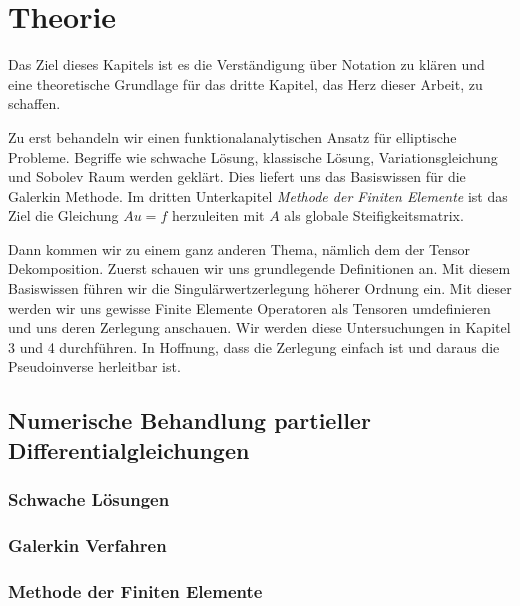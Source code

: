 \documentclass[12pt,a4paper]{scrartcl}
\numberwithin{equation}{section}
\begin{document}


\newpage

\section{Theorie}
Das Ziel dieses Kapitels ist es die Verständigung über Notation zu klären und eine theoretische Grundlage für das dritte Kapitel, das Herz dieser Arbeit, zu schaffen.

Zu erst behandeln wir einen funktionalanalytischen Ansatz für elliptische Probleme. Begriffe wie schwache Lösung, klassische Lösung, Variationsgleichung und Sobolev Raum werden geklärt. Dies liefert uns das Basiswissen für die Galerkin Methode. 
Im dritten Unterkapitel \textit{Methode der Finiten Elemente} ist das Ziel die Gleichung $Au=f$ herzuleiten mit $A$ als globale Steifigkeitsmatrix.

Dann kommen wir zu einem ganz anderen Thema, nämlich dem der Tensor Dekomposition. 
Zuerst schauen wir uns grundlegende Definitionen an. Mit diesem Basiswissen führen wir die Singulärwertzerlegung höherer Ordnung ein. Mit dieser werden wir uns gewisse Finite Elemente Operatoren als Tensoren umdefinieren und uns deren Zerlegung anschauen. Wir werden diese Untersuchungen in Kapitel 3 und 4 durchführen. In Hoffnung, dass die Zerlegung einfach ist und daraus die Pseudoinverse herleitbar ist.


\subsection{Numerische Behandlung partieller Differentialgleichungen}
\subsubsection{Schwache Lösungen}


\subsubsection{Galerkin Verfahren}


\subsubsection{Methode der Finiten Elemente}


%
\end{document}
